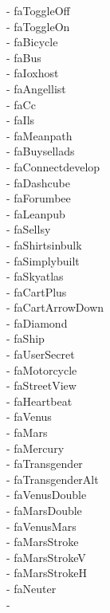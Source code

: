 \documentclass[%
               doublesided,
               paper=a4,
               fontsize=10pt
              ]{my-resume}
\begin{document}
\faToggleOff - faToggleOff\\ \faToggleOn - faToggleOn\\ \faBicycle - faBicycle\\ \faBus - faBus\\ \faIoxhost - faIoxhost\\ \faAngellist - faAngellist\\ \faCc - faCc\\ \faIls - faIls\\ \faMeanpath - faMeanpath\\ \faBuysellads - faBuysellads\\ \faConnectdevelop - faConnectdevelop\\ \faDashcube - faDashcube\\ \faForumbee - faForumbee\\ \faLeanpub - faLeanpub\\ \faSellsy - faSellsy\\ \faShirtsinbulk - faShirtsinbulk\\ \faSimplybuilt - faSimplybuilt\\ \faSkyatlas - faSkyatlas\\ \faCartPlus - faCartPlus\\ \faCartArrowDown - faCartArrowDown\\ \faDiamond - faDiamond\\ \faShip - faShip\\ \faUserSecret - faUserSecret\\ \faMotorcycle - faMotorcycle\\ \faStreetView - faStreetView\\ \faHeartbeat - faHeartbeat\\ \faVenus - faVenus\\ \faMars - faMars\\ \faMercury - faMercury\\ \faTransgender - faTransgender\\ \faTransgenderAlt - faTransgenderAlt\\ \faVenusDouble - faVenusDouble\\ \faMarsDouble - faMarsDouble\\ \faVenusMars - faVenusMars\\ \faMarsStroke - faMarsStroke\\ \faMarsStrokeV - faMarsStrokeV\\ \faMarsStrokeH - faMarsStrokeH\\ \faNeuter - faNeuter\\ \faGenderless - 
\end{document}
